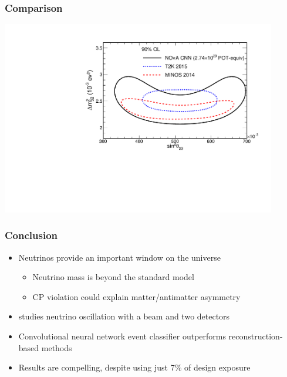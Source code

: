 \documentclass[10pt,professionalfonts,xcolor=table]{beamer}
\begin{document}
\begin{frame}
\frametitle{Comparison}
\centering
\includegraphics[angle=-90, width=0.9\textwidth]{figures/results/fd_extrap_contour_OverlayT2KMINOS.pdf}
\end{frame}



\begin{frame}
\frametitle{Conclusion}
\begin{itemize}
\item Neutrinos provide an important window on the universe
  \begin{itemize}
  \item Neutrino mass is beyond the standard model
  \item CP violation could explain matter/antimatter asymmetry
  \end{itemize}
\gap
\item \nova studies neutrino oscillation with a beam and two detectors
\gap
\item Convolutional neural network event classifier outperforms reconstruction-based methods
\gap
\item Results are compelling, despite using just 7\% of \nova design exposure
\end{itemize}

\end{frame}
\end{document}
